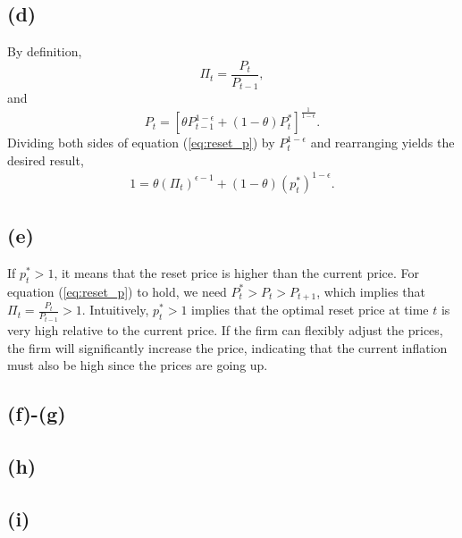 \documentclass[12pt]{article}
\begin{document}
\subsection*{(d)}

By definition, 
\begin{equation}
\label{eq:pi}
\Pi_{t} = \frac{P_{t}}{P_{t-1}},
\end{equation} 
and
\begin{equation}
\label{eq:reset_p}
P_{t} = \left[\theta P^{1-\epsilon}_{t-1} + \left(1-\theta\right)P^{\ast}_{t}\right]^{\frac{1}{1-\epsilon}}.
\end{equation}
Dividing both sides of equation (\ref{eq:reset_p}) by $P^{1-\epsilon}_{t}$ and rearranging yields the desired result,
\begin{align*}
1 = \theta\left(\Pi_{t}\right)^{\epsilon-1}+\left(1-\theta\right)\left(p^{\ast}_{t}\right)^{1-\epsilon}.
\end{align*}

\subsection*{(e)}

If $p^{\ast}_{t} > 1$, it means that the reset price is higher than the current price. 
For equation (\ref{eq:reset_p}) to hold, we need $P_{t}^{\ast} > P_{t} > P_{t+1}$, which implies that $\Pi_{t}=\frac{P_{t}}{P_{t-1}} > 1$.
Intuitively, $p^{\ast}_{t} > 1$ implies that the optimal reset price at time $t$ is very high relative to the current price. 
If the firm can flexibly adjust the prices, the firm will significantly increase the price, 
indicating that the current inflation must also be high since the prices are going up.

\subsection*{(f)-(g)}

\subsection*{(h)}

\subsection*{(i)}
\end{document}
